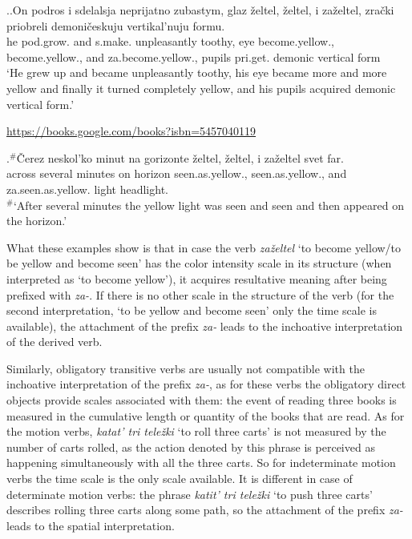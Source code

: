 \ex.\label{ex:zazeltet:test}\ag.\label{ex:zazeltet:test1}On podros i sdelalsja neprijatno zubastym, glaz \v{z}eltel, \v{z}eltel, i za\v{z}eltel, zra\v{c}ki priobreli demoni\v{c}eskuju vertikal'nuju formu.\\
he pod.grow. and s.make. unpleasantly toothy, eye become.yellow., become.yellow., and za.become.yellow., pupils pri.get. demonic vertical form\\
\vspace{0.5em}
`He grew up and became unpleasantly toothy, his eye became more and more yellow and finally it turned completely yellow, and his pupils acquired demonic vertical form.'
\begin{flushright}
\vspace{-0.5em}
\url{https://books.google.com/books?isbn=5457040119}
\end{flushright}
\bg.$^\#$\v{C}erez neskol'ko minut na gorizonte \v{z}eltel, \v{z}eltel, i za\v{z}eltel svet far.\label{ex:zazeltet:test2}\\
across several minutes on horizon seen.as.yellow., seen.as.yellow., and za.seen.as.yellow. light headlight.\\
\vspace{0.5em}
$^\#$`After several minutes the yellow light was seen and seen and then appeared on the horizon.'

What these examples show is that in case the verb \textit{za\v{z}eltel} `to become yellow/to be yellow and become seen' has the color intensity scale in its structure (when interpreted as `to become yellow'), it acquires resultative meaning after being prefixed with \textit{za-}. If there is no other scale in the structure of the verb (for the second interpretation, `to be yellow and become seen' only the time scale is available), the attachment of the prefix \textit{za-} leads to the inchoative interpretation of the derived verb.

Similarly, obligatory transitive verbs are usually not compatible with the inchoative interpretation of the prefix \textit{za-}, as for these verbs the obligatory direct objects provide scales associated with them: the event of reading three books is measured in the cumulative length or quantity of the books that are read. As for the motion verbs, \textit{katat' tri tele\v{z}ki} `to roll three carts' is not measured by the number of carts rolled, as the action denoted by this phrase is perceived as happening simultaneously with all the three carts. So for indeterminate motion verbs the time scale is the only scale available. It is different in case of determinate motion verbs: the phrase \textit{katit' tri tele\v{z}ki} `to push three carts' describes rolling three carts along some path, so the attachment of the prefix \textit{za-} leads to the spatial interpretation.

